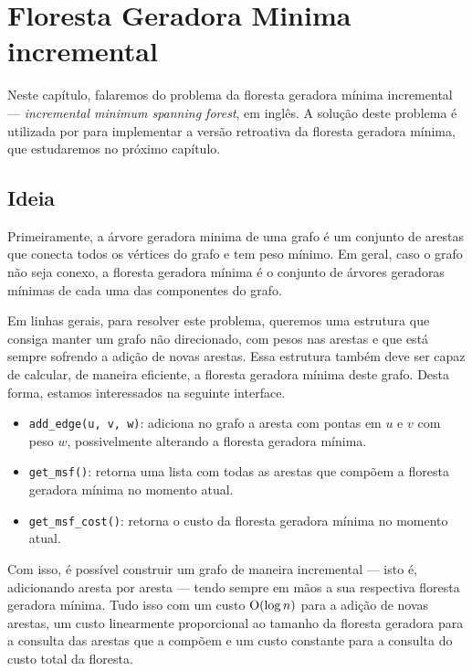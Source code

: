 
\chapter{Floresta Geradora Minima incremental}
\label{cap:incremental-msf}

Neste capítulo, falaremos do problema da floresta geradora mínima incremental --- \emph{incremental minimum spanning forest}, em inglês. A solução deste problema é utilizada por \citet{10.1093/comjnl/bxaa135} para implementar a versão retroativa da floresta geradora mínima, que estudaremos no próximo capítulo.

\section{Ideia}
\label{sec:imsf-ideia}

Primeiramente, a árvore geradora minima de uma grafo é um conjunto de arestas que conecta todos os vértices do grafo e tem peso mínimo. Em geral, caso o grafo não seja conexo, a floresta geradora mínima é o conjunto de árvores geradoras mínimas de cada uma das componentes do grafo.

Em linhas gerais, para resolver este problema, queremos uma estrutura que consiga manter um grafo não direcionado, com pesos nas arestas e que está sempre sofrendo a adição de novas arestas. Essa estrutura também deve ser capaz de calcular, de maneira eficiente, a floresta geradora mínima deste grafo. Desta forma, estamos interessados na seguinte interface.

\begin{itemize}
    \item \texttt{add\_edge(u, v, w)}: adiciona no grafo a aresta com pontas em $u$ e $v$ com peso $w$, possivelmente alterando a floresta geradora mínima.
    \item \texttt{get\_msf()}: retorna uma lista com todas as arestas que compõem a floresta geradora mínima no momento atual.
    \item \texttt{get\_msf\_cost()}: retorna o custo da floresta geradora mínima no momento atual.
\end{itemize}

Com isso, é possível construir um grafo de maneira incremental --- isto é, adicionando aresta por aresta --- tendo sempre em mãos a sua respectiva floresta geradora mínima. Tudo isso com um custo $\mathrm{O} (\log n)$ para a adição de novas arestas, um custo linearmente proporcional ao tamanho da floresta geradora para a consulta das arestas que a compõem e um custo constante para a consulta do custo total da floresta.

